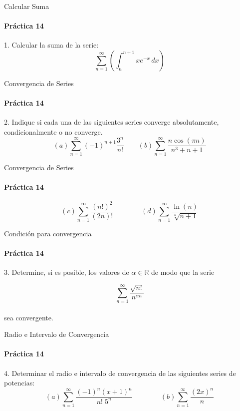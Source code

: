 \documentclass{plantillaPPT}
\begin{document}
\begin{frame}{Calcular Suma}
\framesubtitle{Práctica 14}
\vspace{-1cm}
1. Calcular la suma de la serie:\\[5ex]
\[\sum_{n=1}^{\infty}\left(\int_n^{n+1}xe^{-x}\,dx\right)\]
    
\end{frame}

\begin{frame}{Convergencia de Series}
\framesubtitle{Práctica 14}
\vspace{-1cm}
2. Indique si cada una de las siguientes series converge absolutamente, condicionalmente o no converge.\\[5ex]

\[(a)\sum_{n=1}^\infty(-1)^{n+1}\frac{3^n}{n!} \qquad (b)\sum_{n=1}^\infty\frac{n\cos(\pi n)}{n^3+n+1}\]
    
\end{frame}

\begin{frame}{Convergencia de Series}
\framesubtitle{Práctica 14}

\[(c)\sum_{n=1}^\infty\frac{(n!)^2}{(2n)!} \qquad \qquad (d)\sum_{n=1}^\infty\frac{\ln(n)}{\sqrt[n]{n+1}}\]
    
\end{frame}

\begin{frame}{Condición para convergencia}
\framesubtitle{Práctica 14}

3. Determine, si es posible, los valores de \(\alpha\in\mathbb{R}\) de modo que la serie

\[\sum_{n=1}^\infty\frac{\sqrt{n!}}{n^{\alpha n}}\]
\vspace{0.5cm}\\
sea convergente.
    
\end{frame}

\begin{frame}{Radio e Intervalo de Convergencia}
\framesubtitle{Práctica 14}
\vspace{-1cm}
4. Determinar el radio e intervalo de convergencia de las siguientes series de potencias:\\[5ex]
\[(a)\sum_{n=1}^\infty\frac{(-1)^n(x+1)^n}{n! \;5^n} \qquad \qquad (b)\sum_{n=1}^\infty\frac{(2x)^n}{n}\]
    
\end{frame}
\end{document}
